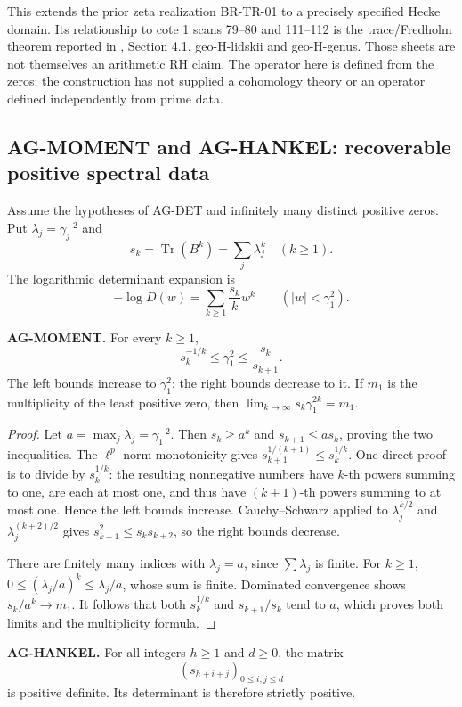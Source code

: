 \documentclass[11pt,a4paper]{article}
\begin{document}
This extends the prior zeta realization BR-TR-01 to a precisely specified
Hecke domain. Its relationship to cote 1 scans 79--80 and 111--112 is
the trace/Fredholm theorem reported in
, Section 4.1,
geo-H-lidskii and geo-H-genus. Those sheets are not themselves an
arithmetic RH claim. The operator here is defined from the zeros; the
construction has not supplied a cohomology theory or an operator defined
independently from prime data.

\subsection{AG-MOMENT and AG-HANKEL: recoverable positive spectral data}
\label{ag:moment}

Assume the hypotheses of AG-DET and infinitely many distinct positive
zeros. Put $\lambda_j=\gamma_j^{-2}$ and
\[
 s_k=\operatorname{Tr}(B^k)=\sum_j\lambda_j^k\quad(k\ge1).
\]
The logarithmic determinant expansion is
\[
 -\log D(w)=\sum_{k\ge1}\frac{s_k}{k}w^k
 \qquad (|w|<\gamma_1^2).
\]

\textbf{AG-MOMENT.} For every $k\ge1$,
\[
 s_k^{-1/k}\le\gamma_1^2\le\frac{s_k}{s_{k+1}}.
\]
The left bounds increase to $\gamma_1^2$; the right bounds decrease to it.
If $m_1$ is the multiplicity of the least positive zero, then
$\lim_{k\to\infty}s_k\gamma_1^{2k}=m_1$.

\begin{proof}
Let $a=\max_j\lambda_j=\gamma_1^{-2}$. Then
$s_k\ge a^k$ and $s_{k+1}\le a s_k$, proving the two inequalities.
The $\ell^p$ norm monotonicity gives
$s_{k+1}^{1/(k+1)}\le s_k^{1/k}$. One direct proof is to divide by
$s_k^{1/k}$: the resulting nonnegative numbers have $k$-th powers
summing to one, are each at most one, and thus have $(k+1)$-th powers
summing to at most one. Hence the left bounds increase.
Cauchy--Schwarz applied to
$\lambda_j^{k/2}$ and $\lambda_j^{(k+2)/2}$ gives
$s_{k+1}^2\le s_ks_{k+2}$, so the right bounds decrease.

There are finitely many indices with $\lambda_j=a$, since $\sum\lambda_j$
is finite. For $k\ge1$,
$0\le(\lambda_j/a)^k\le\lambda_j/a$, whose sum is finite.
Dominated convergence shows
$s_k/a^k\to m_1$. It follows that both $s_k^{1/k}$ and
$s_{k+1}/s_k$ tend to $a$, which proves both limits and the
multiplicity formula.
\end{proof}

\textbf{AG-HANKEL.} For all integers $h\ge1$ and $d\ge0$, the matrix
\[
 (s_{h+i+j})_{0\le i,j\le d}
\]
is positive definite. Its determinant is therefore strictly positive.
\end{document}

